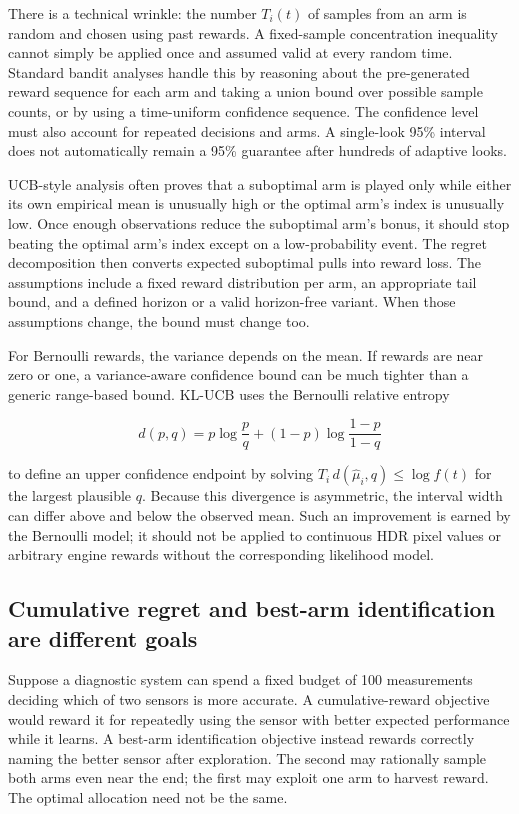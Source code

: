 There is a technical wrinkle: the number \(T_i(t)\) of samples from an arm is random and chosen using past rewards. A fixed-sample concentration inequality cannot simply be applied once and assumed valid at every random time. Standard bandit analyses handle this by reasoning about the pre-generated reward sequence for each arm and taking a union bound over possible sample counts, or by using a time-uniform confidence sequence. The confidence level must also account for repeated decisions and arms. A single-look 95\% interval does not automatically remain a 95\% guarantee after hundreds of adaptive looks.

UCB-style analysis often proves that a suboptimal arm is played only while either its own empirical mean is unusually high or the optimal arm's index is unusually low. Once enough observations reduce the suboptimal arm's bonus, it should stop beating the optimal arm's index except on a low-probability event. The regret decomposition then converts expected suboptimal pulls into reward loss. The assumptions include a fixed reward distribution per arm, an appropriate tail bound, and a defined horizon or a valid horizon-free variant. When those assumptions change, the bound must change too.

For Bernoulli rewards, the variance depends on the mean. If rewards are near zero or one, a variance-aware confidence bound can be much tighter than a generic range-based bound. KL-UCB uses the Bernoulli relative entropy

\[
d(p,q)=p\log\frac pq+(1-p)\log\frac{1-p}{1-q}
\]

to define an upper confidence endpoint by solving \(T_i\,d(\hat\mu_i,q)\le\log f(t)\) for the largest plausible \(q\). Because this divergence is asymmetric, the interval width can differ above and below the observed mean. Such an improvement is earned by the Bernoulli model; it should not be applied to continuous HDR pixel values or arbitrary engine rewards without the corresponding likelihood model.

\subsection{Cumulative regret and best-arm identification are different goals}\label{03-visual-computing-i-ch012-cumulative-regret-and-best-arm-identification-are-different-goals}

Suppose a diagnostic system can spend a fixed budget of 100 measurements deciding which of two sensors is more accurate. A cumulative-reward objective would reward it for repeatedly using the sensor with better expected performance while it learns. A best-arm identification objective instead rewards correctly naming the better sensor after exploration. The second may rationally sample both arms even near the end; the first may exploit one arm to harvest reward. The optimal allocation need not be the same.

